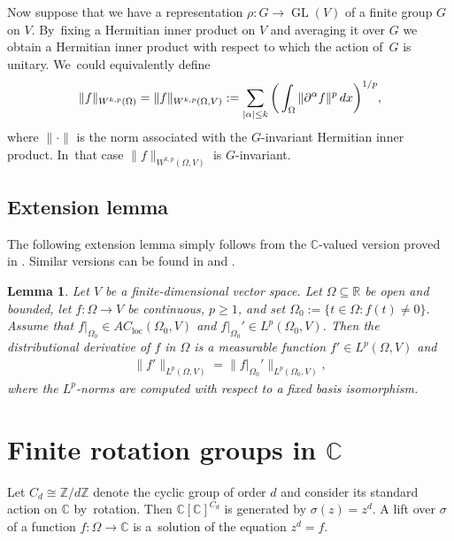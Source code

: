 \documentclass[11pt]{article}
\numberwithin{equation}{section}
\numberwithin{equation}{section}
\newtheorem{Lemma}[Theorem]{Lemma}
\def\al{\alpha}
\def\rh{\rho}
\def\si{\sigma}
\def\Om{\Omega}
\def\C{\mathbb{C}}
\def\R{\mathbb{R}}
\def\Z{\mathbb{Z}}
\def\p{\partial}
\let\on=\operatorname
\begin{document}
Now suppose that we have a representation $\rh \colon G \to \on{GL}(V)$ of a finite group $G$ on
$V$. By~fixing a Hermitian inner product on $V$ and averaging it over $G$ we obtain a Hermitian inner product
with respect to which the action of~$G$ is unitary. We~could equivalently define
\begin{gather*}
 \|f\|_{W^{k,p}(\Om)} = \|f\|_{W^{k,p}(\Om,V)} := \sum_{|\al| \le k} \bigg(\int_{\Om} \|\p^\al f\|^p \, {\rm d}x\bigg)^{1/p},
 \end{gather*}
 where $\|\cdot\|$ is the norm associated with the $G$-invariant Hermitian inner product. In~that case $\|f\|_{W^{k,p}(\Om,V)}$ is $G$-invariant.


\subsection{Extension lemma}


The following extension lemma simply follows from the $\C$-valued version proved in \cite{ParusinskiRainer15}.
Similar versions can be found in \cite[Lemma 2.1]{ParusinskiRainerAC}
and \cite[Lemma 3.2]{GhisiGobbino13}.

\begin{Lemma} \label{lem:extend}
 Let $V$ be a finite-dimensional vector space.
 Let $\Om \subseteq \R$ be open and bounded, let $f \colon \Om \to V$ be continuous, $p \ge 1$,
 and set $\Om_0 := \{t \in \Om \colon f(t) \ne 0\}$.
 Assume that $f|_{\Om_0} \in AC_{\on{loc}}(\Om_0,V)$ and $f|_{\Om_0}' \in L^p(\Om_0,V)$.
 Then the distributional derivative of $f$ in $\Om$ is a measurable function $f' \in L^p(\Om,V)$ and
 \begin{gather*} %
 \|f'\|_{L^p(\Om,V)} = \|f|_{\Om_0}'\|_{L^p(\Om_0,V)},
 \end{gather*}
 where the $L^p$-norms are computed with respect to a fixed basis isomorphism.
\end{Lemma}

\section[Finite rotation groups in C]{Finite rotation groups in $\C$}\label{radicals}

Let $C_d \cong \Z/d\Z$ denote the cyclic group of order $d$ and consider its standard action on $\C$ by~rota\-tion.
Then $\C[\C]^{C_d}$ is generated by $\si(z) = z^d$. A lift over $\si$ of a function $f \colon \Om \to \C$ is a~solution of the
equation $z^d = f$.
\end{document}
